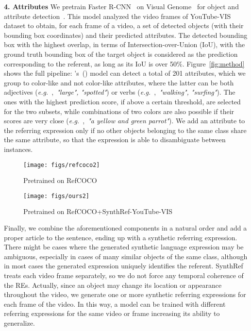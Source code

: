 \documentclass[11pt]{article}
\newcommand{\eg}{\textit{e.g.~}}
\begin{document}
\noindent
\textbf{4. Attributes}\quad 
We pretrain Faster R-CNN~\citep{ren2015faster} on Visual Genome~\citep{krishna2017visual} for object and attribute detection~\citep{tang2020unbiased}. 
This model analyzed the video frames of YouTube-VIS~\citep{yang2019video} dataset to obtain, for each frame of a video, a set of detected objects (with their bounding box coordinates) and their predicted attributes. The detected bounding box with the highest overlap, in terms of Intersection-over-Union (IoU), with the ground truth bounding box of the target object is considered as the prediction corresponding to the referent, as long as its IoU is over 50\%. 
Figure~\ref{fig:method} shows the full pipeline: 
\citeauthor{tang2020unbiased}'s~(\citeyear{tang2020unbiased}) model can detect a total of 201 attributes, which 
we group to color-like and not color-like attributes, where the latter can be both adjectives (\eg,~\textit{"large", "spotted"}) or verbs (\eg,~\textit{"walking", "surfing"}). 
 The ones with the highest prediction score, if above a certain threshold, are selected for the two subsets, while combinations of two colors are also possible if their scores are very close (\eg,~\textit{"a yellow and green parrot"}). 
We add an attribute to the referring expression 
only if no other objects belonging to the same class share the same attribute, so that the expression is able to disambiguate between instances. 

\begin{figure*}[t!]
\centering
\begin{subfigure}[t]{0.49\textwidth}
\centering
\texttt{[image: figs/refcoco2]}
\caption{Pretrained on RefCOCO}
\label{subfig:refcoco}
\end{subfigure}
\hfill
\begin{subfigure}[t]{0.49\textwidth}
\centering
\texttt{[image: figs/ours2]}
\caption{Pretrained on RefCOCO+SynthRef-YouTube-VIS}
\label{subfig:ours}
\end{subfigure}
\caption{Qualitative results on DAVIS-2017. Subfigure \ref{subfig:refcoco} (left) shows results when the model is pretrained only on RefCOCO, while Subfigure \ref{subfig:ours} (right) when it is also trained on our synthetic dataset.}
\label{fig:results}
\end{figure*}



Finally, we combine the aforementioned components in a natural order and add a proper article to the sentence, ending up with a synthetic referring expression. 
There might be cases where the generated synthetic language expression may be ambiguous, especially in cases of many similar objects of the same class, although in most cases the generated expression uniquely identifies the referent. 
SynthRef treats each video frame separately, so we do not force any temporal coherence of the REs.
Actually, since an object may change its location or appearance throughout the video, we generate one or more synthetic referring expressions for each frame of the video. 
In this way, a model can be trained with different referring expressions for the same video or frame increasing its ability to generalize.
\end{document}
